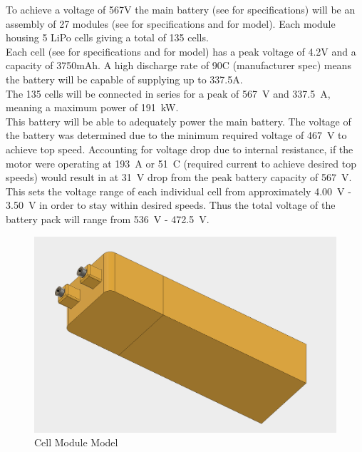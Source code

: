 \documentclass[main.tex]{subfiles}
\begin{document}
    To achieve a voltage of 567V the main battery (see  for specifications) will be an assembly of 27 modules (see  for specifications and  for model). Each module housing 5 LiPo cells giving a total of 135 cells.\\

    Each cell (see  for specifications and  for model) has a peak voltage of 4.2V and a capacity of 3750mAh. A high discharge rate of 90C (manufacturer spec) means the battery will be capable of supplying up to 337.5A.\\

    The 135 cells will be connected in series for a peak of \SI{567}{V} and \SI{337.5}{A}, meaning a maximum power of \SI{191}{kW}.\\
    
    This battery will be able to adequately power the main battery. The voltage of the battery was determined due to the minimum required voltage of \SI{467}{V} to achieve top speed. Accounting for voltage drop due to internal resistance, if the motor were operating at \SI{193}{A} or \SI{51}{C} (required current to achieve desired top speeds) would result in at \SI{31}{V} drop from the peak battery capacity of \SI{567}{V}. This sets the voltage range of each individual cell from approximately \SI{4.00}{V} - \SI{3.50}{V} in order to stay within desired speeds. Thus the total voltage of the battery pack will range from \SI{536}{V} - \SI{472.5}{V}.\\
    
    \begin{figure}[H]
        \centering
        \includegraphics[width=\linewidth]{images/cell_module}
        \caption{Cell Module Model}
        \label{fig:module-model}
    \end{figure}
    
\end{document}
